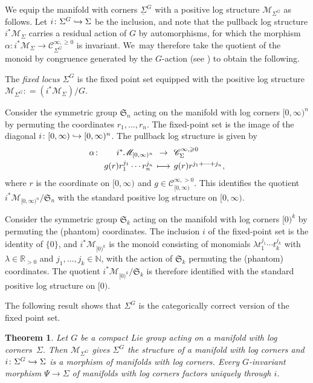 \documentclass[10pt]{amsart}
\newcommand\mto{\mathchoice{\longmapsto}{\mapsto}{\mapsto}{\mapsto}}
\newcommand\hto{\mathrel{\lhook\joinrel\to}}
\newcommand{\mapdef}[5]{\arraycolsep2pt
\begin{array}{crcl}
#1 \colon & #2 &\dpl\to & #3 \\[3pt]
& #4 &\dpl\mto& #5
\end{array}
}
\newtheorem{theorem}{Theorem}[section]
\theoremstyle{definition}
\theoremstyle{remark}
\newenvironment{example}
  {\pushQED{\qed}\renewcommand{\qedsymbol}{$\lozenge$}\examplex}
  {\popQED\endexamplex}
\let\defn\emph
\newcommand{\RR}{\mathbb{R}}
\newcommand{\NN}{\mathbb{N}}
\newcommand{\halfspc}[1]{[0,\infty)^{#1}}
\renewcommand{\ge}{\geqslant}
\newcommand{\defas}{\mathrel{\mathop:}=}
\newcommand{\cM}{\mathscr{M}}
\newcommand{\Cinfpos}[1]{\mathscr{C}^{\infty, > 0}_{#1}}
\newcommand{\Cinfge}[1]{\mathscr{C}^{\infty, \ge 0}_{#1}}
\newcommand{\Sig}{\Sigma}
\newcommand{\uSig}{\underline{\Sigma}}
\newcommand{\symgp}[1]{\mathfrak{S}_{#1}}
\let\dpl\displaystyle
\begin{document}
We equip the manifold with corners $\uSig^G$ with a positive log structure $\cM_{\Sig^G}$ as follows. Let $i\colon \Sig^G \hto\Sig$ be the inclusion, and note that the pullback log structure $i^*\cM_{\Sig}$ carries a residual action of $G$ by automorphisms, for which the morphism $\alpha\colon i^*\cM_{\Sig} \to \Cinfge{\Sig^G}$ is invariant. We~may therefore take the quotient of the monoid by congruence generated by the $G$\nobreakdash-action (see \cite[\S{}I.1.1]{Ogus}) to obtain the following.
\begin{definition}
The \defn{fixed locus $\Sig^G$} is the fixed point set equipped with the positive log structure $\cM_{\Sig^G}\defas (i^*\cM_{\Sig})/G$.
\end{definition}

\begin{example}\label{ex:quotient-basic}
Consider the symmetric group $\symgp{n}$ acting on the manifold with log corners $\halfspc{n}$ by permuting the coordinates $r_1,\ldots,r_n$. The fixed-point set is the image of the diagonal $i\colon[0,\infty)\hto\halfspc{n}$. The pullback log structure is given by
\[
\mapdef{\alpha}{i^*\cM_{\halfspc{n}}}{\Cinfge{\Sig}}
{g(r)r_1^{j_1}\cdots r_n^{j_n}}{g(r)r^{j_1+\cdots+j_n},}
\]
where $r$ is the coordinate on $\halfspc{}$ and $g \in \Cinfpos{\halfspc{}}$. This identifies the quotient $i^*\cM_{\halfspc{n}}/\symgp{n}$ with the standard positive log structure on $[0,\infty)$.
\end{example}

\begin{example}\label{ex:quotient-phantom}
Consider the symmetric group $\symgp{k}$ acting on the manifold with log corners $[0)^k$ by permuting the (phantom) coordinates. The inclusion $i$ of the fixed-point set is the identity of $\{0\}$, and $i^*\cM_{[0)^k}$ is the monoid consisting of monomials $\lambda t_1^{j_1}\cdots t_k^{j_k}$ with $\lambda\in\RR_{>0}$ and $j_1,\ldots,j_k\in\NN$, with the action of $\symgp{k}$ permuting the (phantom) coordinates. The quotient $i^*\cM_{[0)^k}/\symgp{k}$ is therefore identified with the standard positive log structure on $[0)$.
\end{example}

The following result shows that $\Sig^G$ is the categorically correct version of the fixed point set.

\begin{theorem}\label{thm:fixed-locus}
Let $G$ be a compact Lie group acting on a manifold with log corners~$\Sig$. Then $\cM_{\Sig^G}$ gives $\Sig^G$ the structure of a manifold with log corners and $i\colon \Sig^G\hto \Sig$ is a morphism of manifolds with log corners. Every $G$\nobreakdash-invariant morphism $\Psi \to \Sig$ of manifolds with log corners factors uniquely through $i$.
\end{theorem}
\end{document}
